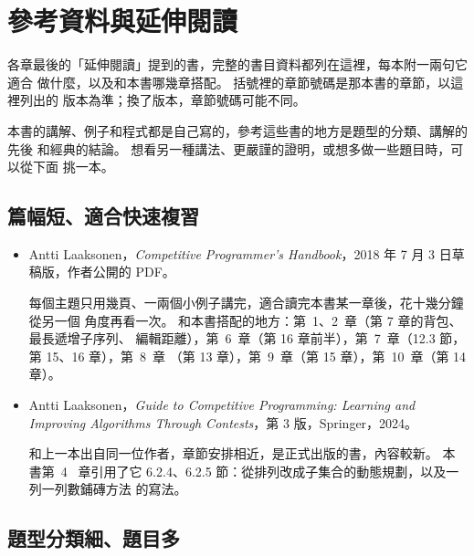 \chapter*{參考資料與延伸閱讀}
\label{ch:references}

各章最後的「延伸閱讀」提到的書，完整的書目資料都列在這裡，每本附一兩句它適合
做什麼，以及和本書哪幾章搭配。 括號裡的章節號碼是那本書的章節，以這裡列出的
版本為準；換了版本，章節號碼可能不同。

本書的講解、例子和程式都是自己寫的，參考這些書的地方是題型的分類、講解的先後
和經典的結論。 想看另一種講法、更嚴謹的證明，或想多做一些題目時，可以從下面
挑一本。

\section*{篇幅短、適合快速複習}

\begin{itemize}
\item Antti Laaksonen，\textit{Competitive Programmer's Handbook}，2018 年 7 月
3 日草稿版，作者公開的 PDF。

每個主題只用幾頁、一兩個小例子講完，適合讀完本書某一章後，花十幾分鐘從另一個
角度再看一次。 和本書搭配的地方：第~1、2~章（第 7 章的背包、最長遞增子序列、
編輯距離），第~6~章（第 16 章前半），第~7~章（12.3 節，第 15、16 章），第~8~章
（第 13 章），第~9~章（第 15 章），第~10~章（第 14 章）。

\item Antti Laaksonen，\textit{Guide to Competitive Programming: Learning and
Improving Algorithms Through Contests}，第 3 版，Springer，2024。

和上一本出自同一位作者，章節安排相近，是正式出版的書，內容較新。 本書第~4~%
章引用了它 6.2.4、6.2.5 節：從排列改成子集合的動態規劃，以及一列一列數鋪磚方法
的寫法。
\end{itemize}

\section*{題型分類細、題目多}

